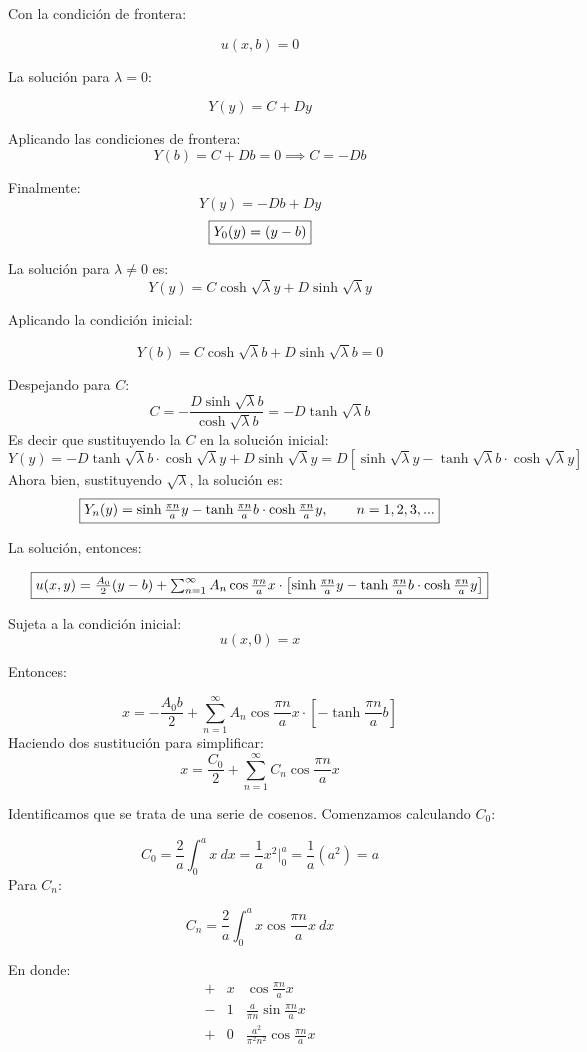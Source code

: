 \begin{solution}
Con la condición de frontera: 

$$u(x,b)=0$$

\linita 

La solución para $\lambda=0$: 

$$Y(y)=C+Dy$$

Aplicando las condiciones de frontera: 
$$Y(b)= C+Db=0\implies C=-Db$$

Finalmente: 
$$Y(y)=-Db+Dy$$
$$\fbox{$Y_0(y)=(y-b)$}$$

\linita

La solución para $\lambda\neq0$ es:
$$Y(y)= C\cosh \sqrt{\lambda} y +D\sinh \sqrt{\lambda}y$$

Aplicando la condición inicial: 

$$Y(b)=C\cosh\sqrt{\lambda}b+D\sinh\sqrt{\lambda}b=0$$

Despejando para $C$:
$$C=-\frac{D\sinh\sqrt{\lambda}b}{\cosh\sqrt{\lambda}b}=-D\tanh\sqrt{\lambda}b $$
Es decir que sustituyendo la $C$ en la solución inicial: 
$$Y(y)= -D\tanh\sqrt{\lambda}b\cdot \cosh \sqrt{\lambda} y +D\sinh \sqrt{\lambda}y=D\left[\sinh \sqrt{\lambda}y-\tanh\sqrt{\lambda}b\cdot \cosh \sqrt{\lambda} y\right]$$
Ahora bien, sustituyendo $\sqrt{\lambda}$, la solución es: 
$$\fbox{$Y_n(y)=\sinh \frac{\pi n}{a}y-\tanh\frac{\pi n}{a}b\cdot \cosh \frac{\pi n}{a} y,\qquad n=1,2,3,...$}$$

\linea 

La solución, entonces: 

$$\fbox{$u(x,y)=\frac{A_0}{2}(y-b)+\sum_{n=1}^\infty A_n\cos \frac{\pi n}{a}x\cdot \left[\sinh \frac{\pi n}{a}y-\tanh\frac{\pi n}{a}b\cdot \cosh \frac{\pi n}{a} y \right]$}$$

Sujeta a la condición inicial: 
$$u(x,0)=x$$

Entonces: 

$$x=-\frac{A_0b}{2}+\sum_{n=1}^\infty A_n\cos \frac{\pi n}{a}x\cdot \left[-\tanh\frac{\pi n}{a}b\right]$$
Haciendo dos sustitución para simplificar: 
$$x=\frac{C_0}{2}+\sum_{n=1}^\infty C_n\cos \frac{\pi n}{a}x$$

\linita 

Identificamos que se trata de una serie de cosenos. Comenzamos calculando $C_0$: 

$$C_0=\frac{2}{a}\int_0^a x \ dx  = \frac{1}{a} x^2\Big|_0^a= \frac{1}{a}(a^2)=a$$
Para $C_n$: 

$$C_n= \frac{2}{a}\int_0^a x\cos\frac{\pi n}{a}x \ dx $$

En donde: 
$$
\begin{array}{ccc}
    + & x & \cos\frac{\pi n}{a}x \\
    - & 1 & \frac{a}{\pi n}\sin\frac{\pi n}{a}x\\
    + & 0 & \frac{a^2}{\pi^2 n^2} \cos\frac{\pi n}{a}x
\end{array}$$


\end{solution}
